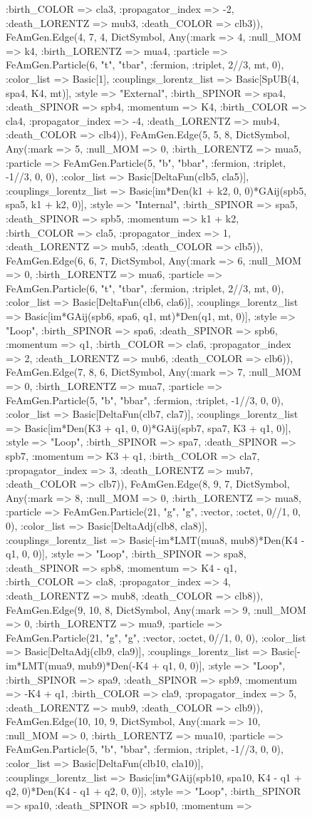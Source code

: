 \documentclass{revtex4}
\begin{document}
\begin{figure}[!htb]
\begin{center}
{:birth_COLOR => cla3, :propagator_index => -2, :death_LORENTZ => mub3, :death_COLOR => clb3)), FeAmGen.Edge(4, 7, 4, Dict{Symbol, Any}(:mark => 4, :null_MOM => k4, :birth_LORENTZ => mua4, :particle => FeAmGen.Particle(6, "t", "tbar", :fermion, :triplet, 2//3, mt, 0), :color_list => Basic[1], :couplings_lorentz_list => Basic[SpUB(4, spa4, K4, mt)], :style => "External", :birth_SPINOR => spa4, :death_SPINOR => spb4, :momentum => K4, :birth_COLOR => cla4, :propagator_index => -4, :death_LORENTZ => mub4, :death_COLOR => clb4)), FeAmGen.Edge(5, 5, 8, Dict{Symbol, Any}(:mark => 5, :null_MOM => 0, :birth_LORENTZ => mua5, :particle => FeAmGen.Particle(5, "b", "bbar", :fermion, :triplet, -1//3, 0, 0), :color_list => Basic[DeltaFun(clb5, cla5)], :couplings_lorentz_list => Basic[im*Den(k1 + k2, 0, 0)*GAij(spb5, spa5, k1 + k2, 0)], :style => "Internal", :birth_SPINOR => spa5, :death_SPINOR => spb5, :momentum => k1 + k2, :birth_COLOR => cla5, :propagator_index => 1, :death_LORENTZ => mub5, :death_COLOR => clb5)), FeAmGen.Edge(6, 6, 7, Dict{Symbol, Any}(:mark => 6, :null_MOM => 0, :birth_LORENTZ => mua6, :particle => FeAmGen.Particle(6, "t", "tbar", :fermion, :triplet, 2//3, mt, 0), :color_list => Basic[DeltaFun(clb6, cla6)], :couplings_lorentz_list => Basic[im*GAij(spb6, spa6, q1, mt)*Den(q1, mt, 0)], :style => "Loop", :birth_SPINOR => spa6, :death_SPINOR => spb6, :momentum => q1, :birth_COLOR => cla6, :propagator_index => 2, :death_LORENTZ => mub6, :death_COLOR => clb6)), FeAmGen.Edge(7, 8, 6, Dict{Symbol, Any}(:mark => 7, :null_MOM => 0, :birth_LORENTZ => mua7, :particle => FeAmGen.Particle(5, "b", "bbar", :fermion, :triplet, -1//3, 0, 0), :color_list => Basic[DeltaFun(clb7, cla7)], :couplings_lorentz_list => Basic[im*Den(K3 + q1, 0, 0)*GAij(spb7, spa7, K3 + q1, 0)], :style => "Loop", :birth_SPINOR => spa7, :death_SPINOR => spb7, :momentum => K3 + q1, :birth_COLOR => cla7, :propagator_index => 3, :death_LORENTZ => mub7, :death_COLOR => clb7)), FeAmGen.Edge(8, 9, 7, Dict{Symbol, Any}(:mark => 8, :null_MOM => 0, :birth_LORENTZ => mua8, :particle => FeAmGen.Particle(21, "g", "g", :vector, :octet, 0//1, 0, 0), :color_list => Basic[DeltaAdj(clb8, cla8)], :couplings_lorentz_list => Basic[-im*LMT(mua8, mub8)*Den(K4 - q1, 0, 0)], :style => "Loop", :birth_SPINOR => spa8, :death_SPINOR => spb8, :momentum => K4 - q1, :birth_COLOR => cla8, :propagator_index => 4, :death_LORENTZ => mub8, :death_COLOR => clb8)), FeAmGen.Edge(9, 10, 8, Dict{Symbol, Any}(:mark => 9, :null_MOM => 0, :birth_LORENTZ => mua9, :particle => FeAmGen.Particle(21, "g", "g", :vector, :octet, 0//1, 0, 0), :color_list => Basic[DeltaAdj(clb9, cla9)], :couplings_lorentz_list => Basic[-im*LMT(mua9, mub9)*Den(-K4 + q1, 0, 0)], :style => "Loop", :birth_SPINOR => spa9, :death_SPINOR => spb9, :momentum => -K4 + q1, :birth_COLOR => cla9, :propagator_index => 5, :death_LORENTZ => mub9, :death_COLOR => clb9)), FeAmGen.Edge(10, 10, 9, Dict{Symbol, Any}(:mark => 10, :null_MOM => 0, :birth_LORENTZ => mua10, :particle => FeAmGen.Particle(5, "b", "bbar", :fermion, :triplet, -1//3, 0, 0), :color_list => Basic[DeltaFun(clb10, cla10)], :couplings_lorentz_list => Basic[im*GAij(spb10, spa10, K4 - q1 + q2, 0)*Den(K4 - q1 + q2, 0, 0)], :style => "Loop", :birth_SPINOR => spa10, :death_SPINOR => spb10, :momentum => }
\end{center}
\end{figure}
\end{document}
